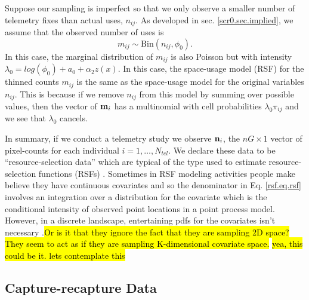 Suppose our sampling is imperfect so that we only observe a smaller
number of telemetry fixes than actual uses, $n_{ij}$. As developed in
sec. \ref{scr0.sec.implied}, we assume that the observed number of
uses is
\[
 m_{ij} \sim \mbox{Bin}(n_{ij}, \phi_{0}).
\]
In this case, the marginal distribution of $m_{ij}$ is also Poisson
but with intensity $\lambda_{0} = log(\phi_{0}) + a_{0} +
\alpha_{2}z(x)$.  In this case, the space-usage model (RSF) for the
thinned counts $m_{ij}$ is the same as the space-usage model for the
original variables $n_{ij}$.  This is because if we remove $n_{ij}$
from this model by summing over possible values, then the vector of
${\bf m}_{i}$ has a multinomial with cell probabilities
$\lambda_{0}\pi_{ij}$ and we see that $\lambda_{0}$ cancels.


In summary, if we conduct a telemetry study we observe ${\bf n}_{i}$,
the $nG \times 1$ vector of pixel-counts for each individual
$i=1,\ldots,N_{tel}$.  We declare these data to be
``resource-selection data'' which are typical of the type used to
estimate resource-selection functions (RSFs) \citep{manly_etal:2002}.
Sometimes in RSF modeling activities people make believe they have
continuous covariates and so the denominator in Eq. \ref{rsf.eq.rsf}
involves an integration over a distribution for the covariate which is
the conditional intensity of observed point locations in a point
process model. However, in a discrete landscape, entertaining pdfs for
the covariates isn't necessary \citep{royle_etal:2012mee}.\hl{Or is it
  that they ignore the fact that they are sampling 2D space? They seem
  to act as if they are sampling K-dimensional covariate space.}
\hl{yea, this could be it. lets contemplate this}

\subsection{Capture-recapture Data}

